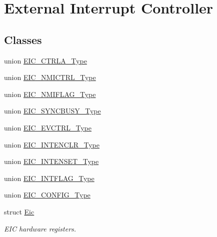 \hypertarget{group___s_a_m_l21___e_i_c}{}\section{External Interrupt Controller}
\label{group___s_a_m_l21___e_i_c}
\subsection*{Classes}
\begin{DoxyCompactItemize}
\item 
union \hyperlink{union_e_i_c___c_t_r_l_a___type}{E\+I\+C\+\_\+\+C\+T\+R\+L\+A\+\_\+\+Type}
\item 
union \hyperlink{union_e_i_c___n_m_i_c_t_r_l___type}{E\+I\+C\+\_\+\+N\+M\+I\+C\+T\+R\+L\+\_\+\+Type}
\item 
union \hyperlink{union_e_i_c___n_m_i_f_l_a_g___type}{E\+I\+C\+\_\+\+N\+M\+I\+F\+L\+A\+G\+\_\+\+Type}
\item 
union \hyperlink{union_e_i_c___s_y_n_c_b_u_s_y___type}{E\+I\+C\+\_\+\+S\+Y\+N\+C\+B\+U\+S\+Y\+\_\+\+Type}
\item 
union \hyperlink{union_e_i_c___e_v_c_t_r_l___type}{E\+I\+C\+\_\+\+E\+V\+C\+T\+R\+L\+\_\+\+Type}
\item 
union \hyperlink{union_e_i_c___i_n_t_e_n_c_l_r___type}{E\+I\+C\+\_\+\+I\+N\+T\+E\+N\+C\+L\+R\+\_\+\+Type}
\item 
union \hyperlink{union_e_i_c___i_n_t_e_n_s_e_t___type}{E\+I\+C\+\_\+\+I\+N\+T\+E\+N\+S\+E\+T\+\_\+\+Type}
\item 
union \hyperlink{union_e_i_c___i_n_t_f_l_a_g___type}{E\+I\+C\+\_\+\+I\+N\+T\+F\+L\+A\+G\+\_\+\+Type}
\item 
union \hyperlink{union_e_i_c___c_o_n_f_i_g___type}{E\+I\+C\+\_\+\+C\+O\+N\+F\+I\+G\+\_\+\+Type}
\item 
struct \hyperlink{struct_eic}{Eic}
\begin{DoxyCompactList}\small\item\em E\+I\+C hardware registers. \end{DoxyCompactList}\end{DoxyCompactItemize}

